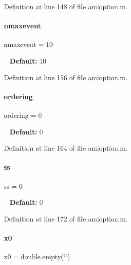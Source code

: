 Definition at line 148 of file amioption.\+m.

\mbox{\label{classamioption_a85519d27e7231ac625e5b2deee92165a}} 
\paragraph{\texorpdfstring{nmaxevent}{nmaxevent}}
{\footnotesize\ttfamily nmaxevent = 10}

~\newline
{\bfseries Default\+:} 10 

Definition at line 156 of file amioption.\+m.

\mbox{\label{classamioption_aa5d555210685086c19e5d08afca6685b}} 
\paragraph{\texorpdfstring{ordering}{ordering}}
{\footnotesize\ttfamily ordering = 0}

~\newline
{\bfseries Default\+:} 0 

Definition at line 164 of file amioption.\+m.

\mbox{\label{classamioption_a8f60c8102d29fcd525162d02eed4566b}} 
\paragraph{\texorpdfstring{ss}{ss}}
{\footnotesize\ttfamily ss = 0}

~\newline
{\bfseries Default\+:} 0 

Definition at line 172 of file amioption.\+m.

\mbox{\label{classamioption_aa48da42c617fdb7cf84e9a3f80aa04e8}} 
\paragraph{\texorpdfstring{x0}{x0}}
{\footnotesize\ttfamily x0 = double.\+empty(\char`\"{}\char`\"{})}

